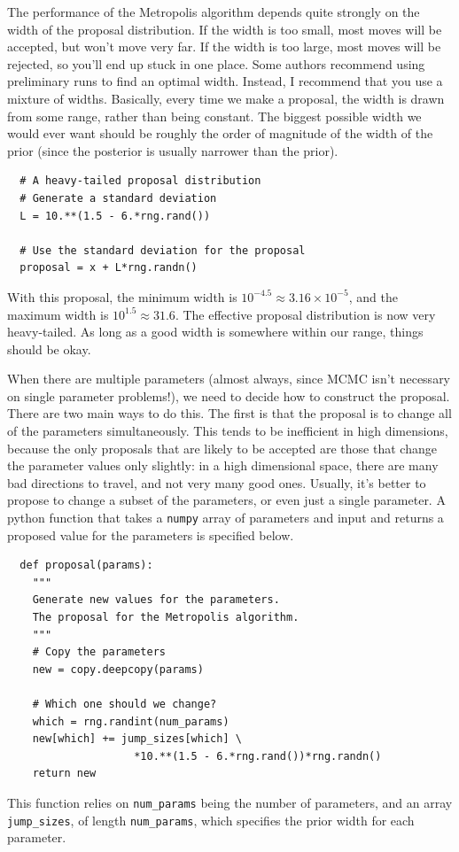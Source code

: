 The performance of the Metropolis algorithm depends quite strongly on
the width of the proposal distribution. If the width is too small, most moves
will be accepted, but won't move very far. If the width is too large, most
moves will be rejected, so you'll end up stuck in one place. Some authors
recommend using preliminary runs to find an optimal width. Instead, I recommend
that you use a mixture of widths. Basically, every time we make a proposal,
the width is drawn from some range, rather than being constant. The biggest
possible width we would ever want should be roughly the order of magnitude of
the width of the prior (since the posterior is usually narrower than the
prior).
\begin{verbatim}
  # A heavy-tailed proposal distribution
  # Generate a standard deviation
  L = 10.**(1.5 - 6.*rng.rand())

  # Use the standard deviation for the proposal
  proposal = x + L*rng.randn()
\end{verbatim}
With this proposal, the minimum width is
$10^{-4.5} \approx 3.16 \times 10^{-5}$, and the maximum width is
$10^{1.5} \approx 31.6$. The effective proposal distribution is now very heavy-tailed. As long as a good width is somewhere within our range, things should be
okay.

When there are multiple parameters (almost always, since MCMC isn't necessary
on single parameter problems!), we need to decide how to construct the proposal.
There are two main ways to do this. The first is that the proposal is to
change all of the parameters simultaneously. This tends to be inefficient in
high dimensions, because the only proposals that are likely to be accepted
are those that change the parameter values only slightly: in a high dimensional
space, there are many bad directions to travel, and not very many good ones.
Usually, it's better to propose to change a subset of the parameters, or even
just a single parameter. A python function that takes a {\tt numpy} array of
parameters and input and returns a proposed value for the parameters is
specified below.

\begin{verbatim}
  def proposal(params):
    """
    Generate new values for the parameters.
    The proposal for the Metropolis algorithm.
    """
    # Copy the parameters
    new = copy.deepcopy(params)

    # Which one should we change?
    which = rng.randint(num_params)
    new[which] += jump_sizes[which] \
                    *10.**(1.5 - 6.*rng.rand())*rng.randn()
    return new
\end{verbatim}
This function relies on {\tt num\_params} being the number of parameters,
and an array {\tt jump\_sizes}, of length {\tt num\_params}, which specifies
the prior width for each parameter.

